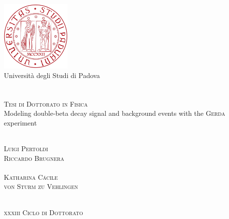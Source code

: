 
\begin{titlepage}
  \thispagestyle{empty}
  \begin{center}
  \includegraphics[width=3.5cm]{img/unipd-logo.pdf} \\
  \vspace{0.5cm}
  {\Large Universit\`a degli Studi di Padova} \\
  \hrulefill \\
   \\
  \vspace{2cm}
  \textsc{\large Tesi di Dottorato in Fisica} \\
  \vspace{3cm}
  \huge{%
    Modeling double-beta decay signal and background events with the
    \textsc{Gerda} experiment%
  }
  \end{center}
  \vspace{3cm}
  \begin{multicols}{2}
  \large
  \noindent
   \\
  \textsc{Luigi Pertoldi}
  \columnbreak
  \flushright
   \\
  \textsc{Riccardo Brugnera} \\
  \vspace{5mm}
   \\
  \textsc{Katharina C\"acile\\von Sturm zu Vehlingen}
  \end{multicols}
  \vspace*{\fill}
  \begin{center}
  \hrulefill \\
  \textsc{\textsc{xxxiii} Ciclo di Dottorato}
  \end{center}
\end{titlepage}
\restoregeometry
